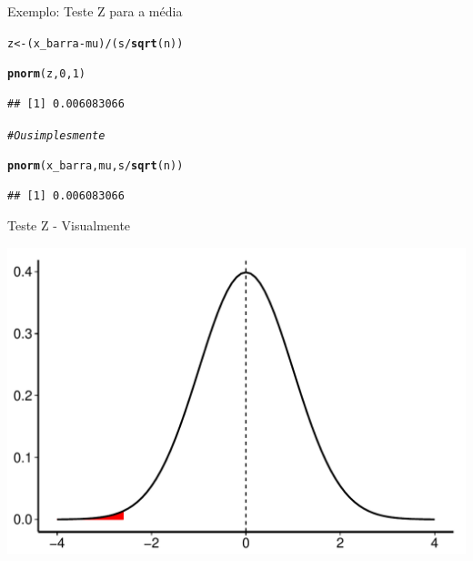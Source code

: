 \documentclass{beamer}\usepackage[]{graphicx}\usepackage[]{color}
\makeatletter
\def\maxwidth{ %
  \ifdim\Gin@nat@width>\linewidth
    \linewidth
  \else
    \Gin@nat@width
  \fi
}
\newcommand{\hlnum}[1]{\textcolor[rgb]{0.686,0.059,0.569}{#1}}%
\newcommand{\hlcom}[1]{\textcolor[rgb]{0.678,0.584,0.686}{\textit{#1}}}%
\newcommand{\hlopt}[1]{\textcolor[rgb]{0,0,0}{#1}}%
\newcommand{\hlstd}[1]{\textcolor[rgb]{0.345,0.345,0.345}{#1}}%
\newcommand{\hlkwb}[1]{\textcolor[rgb]{0.69,0.353,0.396}{#1}}%
\newcommand{\hlkwd}[1]{\textcolor[rgb]{0.737,0.353,0.396}{\textbf{#1}}}%
\newenvironment{kframe}{%
 \def\at@end@of@kframe{}%
 \ifinner\ifhmode%
  \def\at@end@of@kframe{\end{minipage}}%
  \begin{minipage}{\columnwidth}%
 \fi\fi%
 \def\FrameCommand##1{\hskip\@totalleftmargin \hskip-\fboxsep
 \colorbox{shadecolor}{##1}\hskip-\fboxsep
     \hskip-\linewidth \hskip-\@totalleftmargin \hskip\columnwidth}%
 \MakeFramed {\advance\hsize-\width
   \@totalleftmargin\z@ \linewidth\hsize
   \@setminipage}}%
 {\par\unskip\endMakeFramed%
 \at@end@of@kframe}
\newenvironment{knitrout}{}{} %
\renewenvironment{knitrout}{\setlength{\topsep}{0mm}}{}
\makeatother
\begin{document}
\begin{frame}[fragile]{Exemplo: Teste Z para a média}
\begin{knitrout}\tiny
{}\color{fgcolor}\begin{kframe}
\begin{alltt}
\hlstd{z} \hlkwb{<-} \hlstd{(x_barra}\hlopt{-}\hlstd{mu)}\hlopt{/}\hlstd{(s}\hlopt{/}\hlkwd{sqrt}\hlstd{(n))}

\hlkwd{pnorm}\hlstd{(z,}\hlnum{0}\hlstd{,}\hlnum{1}\hlstd{)}
\end{alltt}
\begin{verbatim}
## [1] 0.006083066
\end{verbatim}
\begin{alltt}
\hlcom{# Ou simplesmente}

\hlkwd{pnorm}\hlstd{(x_barra,mu,s}\hlopt{/}\hlkwd{sqrt}\hlstd{(n))}
\end{alltt}
\begin{verbatim}
## [1] 0.006083066
\end{verbatim}
\end{kframe}
\end{knitrout}

\end{frame} 

\begin{frame}[fragile]{Teste Z -  Visualmente}

\begin{knitrout}
\color{fgcolor}
\includegraphics[width=\maxwidth,height=0.7\textheight]{figure/testez-1} 

\end{knitrout}

\end{frame} 
\end{document}
